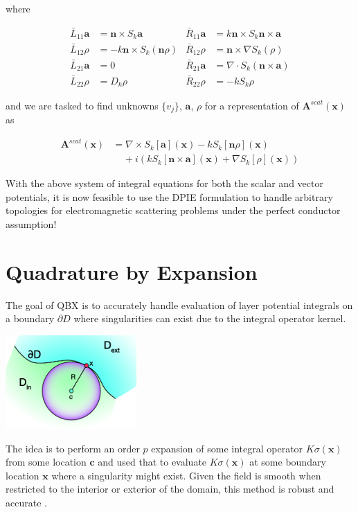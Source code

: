 \documentclass{article}[12pt]
\newcommand{\bvec}[1]{\boldsymbol{#1}}
\begin{document}
	where
	
	\begin{align*}
	\bar{L}_{11} \bvec{a} &= \bvec{n} \times S_k \bvec{a} & \bar{R}_{11} \bvec{a} &= k \bvec{n} \times S_k \bvec{n} \times \bvec{a}\\
	\bar{L}_{12} \rho &= - k \bvec{n} \times S_k\left(\bvec{n} \rho \right) & \bar{R}_{12} \rho &= \bvec{n} \times \nabla S_k\left( \rho \right)\\
	\bar{L}_{21} \bvec{a} &= 0 & \bar{R}_{21} \bvec{a} &= \nabla \cdot S_k \left(\bvec{n} \times \bvec{a}\right) \\
	\bar{L}_{22} \rho &= D_k \rho & \bar{R}_{22} \rho &= - k S_k \rho
	\end{align*}
	
	and we are tasked to find  unknowns $\lbrace v_j\rbrace$, $\bvec{a}$, $\rho$ for a representation of $\bvec{A}^{scat}(\bvec{x})$ as
	
	\begin{align*}
	\bvec{A}^{scat}(\bvec{x}) &= \nabla \times S_k[\bvec{a}](\bvec{x}) - k S_k[\bvec{n}\rho](\bvec{x}) \\
	&\;\;\;\; + i \left(k S_k[\bvec{n} \times \bvec{a}](\bvec{x}) + \nabla S_k[\rho](\bvec{x})\right)
	\end{align*}
	
	With the above system of integral equations for both the scalar and vector potentials, it is now feasible to use the DPIE formulation to handle arbitrary topologies for electromagnetic scattering problems under the perfect conductor assumption!

	
	\section{Quadrature by Expansion}
	The goal of QBX is to accurately handle evaluation of layer potential integrals on a boundary $\partial D$ where singularities can exist due to the integral operator kernel. 
	
	\hfil\hfil\includegraphics[width=5cm]{qbx_image}\hfil\hfil
	
	The idea is to perform an order $p$ expansion of some integral operator $K \sigma (\bvec{x})$ from some location $\bvec{c}$ and used that to evaluate $K \sigma(\bvec{x})$ at some boundary location $\bvec{x}$ where a singularity might exist. Given the field is smooth when restricted to the interior or exterior of the domain, this method is robust and accurate \cite{qbx}. 
	
\end{document}

